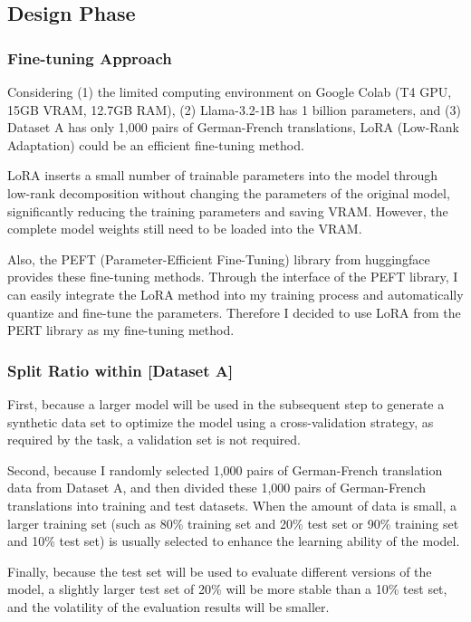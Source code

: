 \subsection{Design Phase}
\label{subsec:design}

\subsubsection{Fine-tuning Approach}
Considering
(1) the limited computing environment on Google Colab (T4 GPU, 15GB VRAM, 12.7GB RAM), 
(2) Llama-3.2-1B has 1 billion parameters, and 
(3) Dataset A has only 1,000 pairs of German-French translations,
LoRA (Low-Rank Adaptation) \cite{hu2021lora} could be an efficient fine-tuning method.

LoRA inserts a small number of trainable parameters into the model 
through low-rank decomposition without changing the parameters of the original model, 
significantly reducing the training parameters and saving VRAM. 
However, the complete model weights still need to be loaded into the VRAM.

Also, the PEFT (Parameter-Efficient Fine-Tuning) library \cite{peft} from huggingface provides these fine-tuning methods.
Through the interface of the PEFT library, 
I can easily integrate the LoRA method into my training process and automatically quantize and fine-tune the parameters.
Therefore I decided to use LoRA from the PERT library as my fine-tuning method.

\subsubsection{Split Ratio within [Dataset A]}
First, because a larger model will be used in the subsequent step to 
generate a synthetic data set to optimize the model using a cross-validation strategy, 
as required by the task, a validation set is not required.

Second, because I randomly selected 1,000 pairs of German-French translation data from Dataset A, 
and then divided these 1,000 pairs of German-French translations into training and test datasets. 
When the amount of data is small, a larger training set 
(such as 80\% training set and 20\% test set or 90\% training set and 10\% test set) 
is usually selected to enhance the learning ability of the model.

Finally, because the test set will be used to evaluate different versions of the model, 
a slightly larger test set of 20\% will be more stable than a 10\% test set, 
and the volatility of the evaluation results will be smaller.

